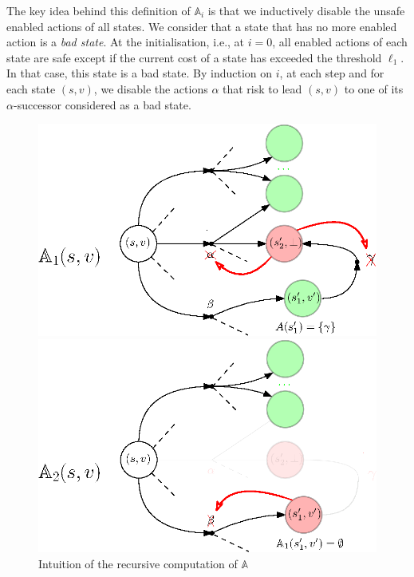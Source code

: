 The key idea behind this definition of $\mathbb{A}_i$ is that we inductively disable the unsafe enabled actions of all states.
We consider that a state that has no more enabled action is a \textit{bad state}.
At the initialisation, i.e., at $i=0$, all enabled actions of each state are safe except if the current cost of a state has exceeded the threshold $\ell_1$. In that case, this state is a bad state.
By induction on $i$, at each step and for each state $(s, v)$,
we disable the actions $\alpha$
that risk to lead $(s, v)$ to one of its $\alpha$-successor considered as a bad state.%
\begin{figure}[h]
  \begin{minipage}{0.5\linewidth}
    \centering
    \includegraphics[width=0.9\linewidth]{resources/attractor}
  \end{minipage}
  \begin{minipage}{0.5\linewidth}
    \centering
    \includegraphics[width=0.9\linewidth]{resources/attractor2}
  \end{minipage}
  \caption{Intuition of the recursive computation of $\mathbb{A}$}
\end{figure}
